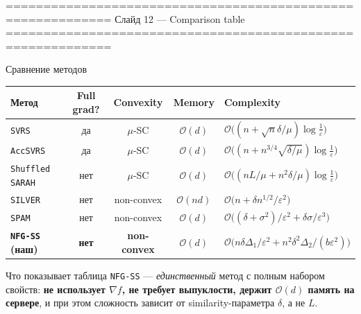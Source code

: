 \documentclass[10pt,aspectratio=169,t]{beamer}
\begin{document}
============================================================
  Слайд 12 — Comparison table
============================================================
\begin{frame}{Сравнение методов}
\vspace{-2mm}
\begin{center}
\renewcommand{\arraystretch}{1.25}
\footnotesize
\begin{tabular}{@{}lcccl@{}}
\toprule
\textbf{Метод} & \textbf{Full grad?} & \textbf{Convexity} & \textbf{Memory} & \textbf{Complexity} \\
\midrule
\texttt{SVRS}\,\citep{lin2023stochastic}          & да  & $\mu$-SC      & $\mathcal{O}(d)$  & $\mathcal{O}\bigl((n+\sqrt{n} \delta/\mu)\log\tfrac{1}{\varepsilon}\bigr)$ \\
\texttt{AccSVRS}\,\citep{lin2023stochastic}       & да  & $\mu$-SC      & $\mathcal{O}(d)$  & $\mathcal{O}\bigl((n + n^{3/4}\sqrt{\delta/\mu})\log\tfrac{1}{\varepsilon}\bigr)$ \\
\texttt{Shuffled SARAH}\,\citep{beznosikov2024random}& нет & $\mu$-SC      & $\mathcal{O}(d)$  & $\mathcal{O}\bigl((nL/\mu + n^2\delta/\mu)\log\tfrac{1}{\varepsilon}\bigr)$ \\
\texttt{SILVER}\,\citep{oko2024silver}            & нет & non-convex    & $\mathcal{O}(nd)$ & $\mathcal{O}\bigl(n + \delta n^{1/2}/\varepsilon^2\bigr)$ \\
\texttt{SPAM}\,\citep{karagulyan2024spamstochasticproximalpoint}      & нет & non-convex    & $\mathcal{O}(d)$  & $\mathcal{O}\bigl((\delta+\sigma^2)/\varepsilon^2 + \delta\sigma/\varepsilon^3\bigr)$ \\
\midrule
\rowcolor{tablerow}\textbf{\texttt{NFG-SS} (наш)} & \textbf{нет} & \textbf{non-convex} & $\mathcal{O}(d)$ & $\mathcal{O}\bigl(n\delta\Delta_1/\varepsilon^2 + n^2\delta^2\Delta_2/(b\varepsilon^2)\bigr)$ \\
\bottomrule
\end{tabular}
\end{center}
\vspace{3mm}
\begin{alertblock}{Что показывает таблица}
\texttt{NFG-SS} — \emph{единственный} метод с полным набором свойств: \textbf{не использует $\nabla f$, не требует выпуклости, держит $\mathcal{O}(d)$ память на сервере}, и при этом сложность зависит от similarity-параметра $\delta$, а не $L$.
\end{alertblock}
\end{frame}
\end{document}
